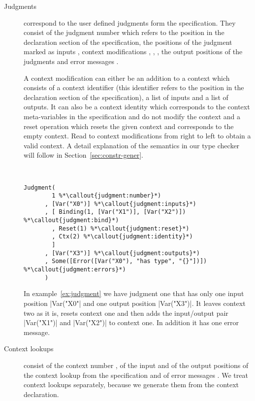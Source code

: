 \begin{description}
\item[Judgments] correspond to the user defined judgments form the
  specification. They consist of the judgment number
   which refers to the position in the
  declaration section of the specification, the positions of the
  judgment marked as inputs , context
  modifications ,
  , , the
  output positions of the judgments  and
  error messages .

  A context modification can either be an addition to a context
   which consists of a context identifier
  (this identifier refers to the position in the declaration section
  of the specification), a list of inputs and a list of outputs. It
  can also be a context identity  which
  corresponds to the context meta-variables in the specification and
  do not modify the context and a reset operation
   which resets the given context and
  corresponds to the empty context. Read to context modifications from
  right to left to obtain a valid context. A detail explanation of the
  semantics in our type checker will follow in
  Section~\ref{sec:constr-gener}.

\begin{example}{~}
\begin{lstlisting}[language=sltc]
Judgment(
        1 %*\callout{judgment:number}*)
      , [Var("X0")] %*\callout{judgment:inputs}*)
      , [ Binding(1, [Var("X1")], [Var("X2")]) %*\callout{judgment:bind}*)
        , Reset(1) %*\callout{judgment:reset}*)
        , Ctx(2) %*\callout{judgment:identity}*)
        ]
      , [Var("X3")] %*\callout{judgment:outputs}*)
      , Some([Error([Var("X0"), "has type", "{}"])]) %*\callout{judgment:errors}*)
      )
\end{lstlisting}
\label{ex:judgment}
\end{example}

In example~\ref{ex:judgment} we have judgment one that has only one
input position \code|Var("X0"| and one output position
\code|Var("X3")|. It leaves context two as it is, resets context one
and then adds the input/output pair \code|Var("X1")| and
\code|Var("X2")| to context one. In addition it has one error message.

\item[Context lookups] consist of the context number
  , of the input  and
  of the output  positions of the context
  lookup from the specification and of error messages
  . We treat context lookups separately,
  because we generate them from the context declaration.


\end{description}
